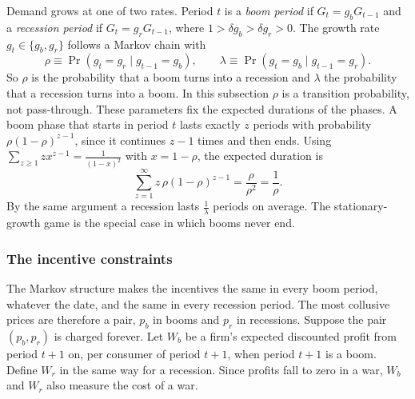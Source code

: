 Demand grows at one of two rates. Period $t$ is a \emph{boom period} if $G_t = g_b G_{t-1}$ and a \emph{recession period}
if $G_t = g_r G_{t-1}$, where $1 > \delta g_b > \delta g_r > 0$. The growth rate $g_t \in \{g_b, g_r\}$ follows a Markov chain with
\begin{equation}\label{eq:12-bs-markov}
\rho \equiv \Pr(g_t = g_r \mid g_{t-1} = g_b), \qquad \lambda \equiv \Pr(g_t = g_b \mid g_{t-1} = g_r).
\end{equation}
So $\rho$ is the probability that a boom turns into a recession and $\lambda$ the probability that a recession turns into a
boom. In this subsection $\rho$ is a transition probability, not pass-through. These parameters fix the expected
durations of the phases. A boom phase that starts in period $t$ lasts exactly $z$ periods with probability
$\rho(1-\rho)^{z-1}$, since it continues $z-1$ times and then ends. Using $\sum_{z \ge 1} z x^{z-1} = \frac{1}{(1-x)^2}$ with
$x = 1 - \rho$, the expected duration is
\begin{equation*}
\sum_{z=1}^{\infty} z\,\rho(1-\rho)^{z-1} = \frac{\rho}{\rho^2} = \frac{1}{\rho}.
\end{equation*}
By the same argument a recession lasts $\frac{1}{\lambda}$ periods on average. The stationary-growth game is the special case
in which booms never end.

\subsubsection{The incentive constraints}

The Markov structure makes the incentives the same in every boom period, whatever the date, and the same in every
recession period. The most collusive prices are therefore a pair, $p_b$ in booms and $p_r$ in recessions. Suppose the
pair $(p_b, p_r)$ is charged forever. Let $W_b$ be a firm's expected discounted profit from period $t+1$ on, per
consumer of period $t+1$, when period $t+1$ is a boom. Define $W_r$ in the same way for a recession. Since
profits fall to zero in a war, $W_b$ and $W_r$ also measure the cost of a war.

